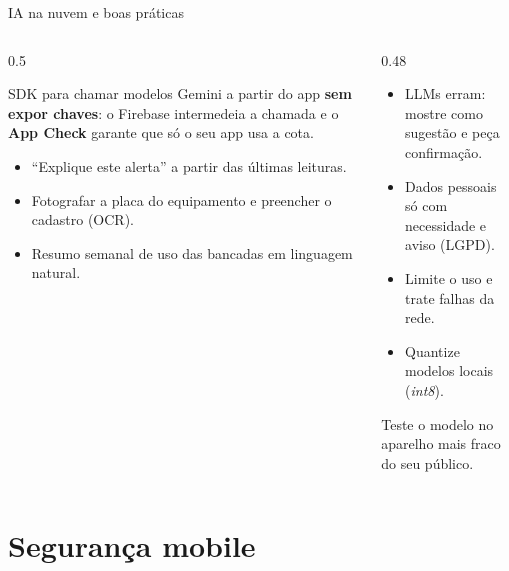 \documentclass[aspectratio=169,10pt]{beamer}
\begin{document}
\begin{frame}{IA na nuvem e boas práticas}
  \begin{columns}[T]
    \begin{column}{0.5\textwidth}
      \begin{conceito}
        SDK para chamar modelos Gemini a partir do app \textbf{sem expor chaves}: o Firebase intermedeia a chamada e o \textbf{App Check} garante que só o seu app usa a cota.
      \end{conceito}
      \begin{exemplo}
        \begin{itemize}
          \item ``Explique este alerta'' a partir das últimas leituras.
          \item Fotografar a placa do equipamento e preencher o cadastro (OCR).
          \item Resumo semanal de uso das bancadas em linguagem natural.
        \end{itemize}
      \end{exemplo}
    \end{column}
    \begin{column}{0.48\textwidth}
      \begin{atencao}[Cuidados]
        \begin{itemize}
          \item LLMs erram: mostre como sugestão e peça confirmação.
          \item Dados pessoais só com necessidade e aviso (LGPD).
          \item Limite o uso e trate falhas da rede.
          \item Quantize modelos locais (\emph{int8}).
        \end{itemize}
      \end{atencao}
      \begin{dica}
        Teste o modelo no aparelho mais fraco do seu público.
      \end{dica}
    \end{column}
  \end{columns}
\end{frame}

\section{Segurança mobile}
\end{document}
